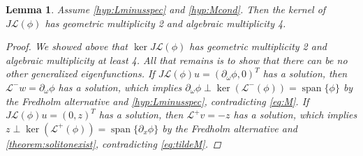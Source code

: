 \documentclass[12pt]{elsarticle}
\def\calL{{\mathcal L}}
\DeclareMathOperator{\spn}{span}
\newtheorem{lemma}{Lemma}
\begin{document}
\begin{lemma}\label{lemma:kernelL}
Assume \cref{hyp:Lminusspec} and \cref{hyp:Mcond}. Then the kernel of $J \calL(\phi)$ has geometric multiplicity 2 and algebraic multiplicity 4.
\begin{proof}
We showed above that $\ker J \calL(\phi)$ has geometric multiplicity 2 and algebraic multiplicity at least 4. All that remains is to show that there can be no other generalized eigenfunctions. If $J \calL(\phi) u = (\partial_\omega \phi, 0)^T$ has a solution, then $\calL^- w = \partial_\omega \phi$ has a solution, which implies $\partial_\omega \phi \perp \ker(\calL^-(\phi)) = \spn\{\phi\}$ by the Fredholm alternative and \cref{hyp:Lminusspec}, contradicting \cref{eq:M}. If $J \calL(\phi) u = (0, z)^T$ has a solution, then $\calL^+ v = -z$ has a solution, which implies $z \perp \ker(\calL^+(\phi)) = \spn\{\partial_x \phi\}$ by the Fredholm alternative and \cref{theorem:solitonexist}, contradicting \cref{eq:tildeM}. 
\end{proof}
\end{lemma}
\end{document}
